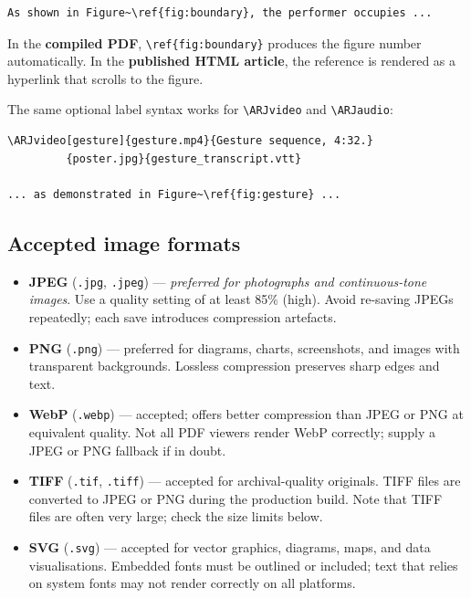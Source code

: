 \begin{verbatim}
As shown in Figure~\ref{fig:boundary}, the performer occupies ...
\end{verbatim}

In the \textbf{compiled PDF}, \verb|\ref{fig:boundary}| produces the
figure number automatically. In the \textbf{published HTML article},
the reference is rendered as a hyperlink that scrolls to the figure.

The same optional label syntax works for \verb|\ARJvideo| and
\verb|\ARJaudio|:

\begin{verbatim}
\ARJvideo[gesture]{gesture.mp4}{Gesture sequence, 4:32.}
         {poster.jpg}{gesture_transcript.vtt}

... as demonstrated in Figure~\ref{fig:gesture} ...
\end{verbatim}

\subsection{Accepted image formats}

\begin{itemize}
  \item \textbf{JPEG} (\texttt{.jpg}, \texttt{.jpeg}) --- \emph{preferred
    for photographs and continuous-tone images}. Use a quality setting of
    at least 85\% (high). Avoid re-saving JPEGs repeatedly; each save
    introduces compression artefacts.
  \item \textbf{PNG} (\texttt{.png}) --- preferred for diagrams, charts,
    screenshots, and images with transparent backgrounds. Lossless
    compression preserves sharp edges and text.
  \item \textbf{WebP} (\texttt{.webp}) --- accepted; offers better
    compression than JPEG or PNG at equivalent quality. Not all PDF
    viewers render WebP correctly; supply a JPEG or PNG fallback if in
    doubt.
  \item \textbf{TIFF} (\texttt{.tif}, \texttt{.tiff}) --- accepted for
    archival-quality originals. TIFF files are converted to JPEG or PNG
    during the production build. Note that TIFF files are often very
    large; check the size limits below.
  \item \textbf{SVG} (\texttt{.svg}) --- accepted for vector graphics,
    diagrams, maps, and data visualisations. Embedded fonts must be
    outlined or included; text that relies on system fonts may not render
    correctly on all platforms.
\end{itemize}


